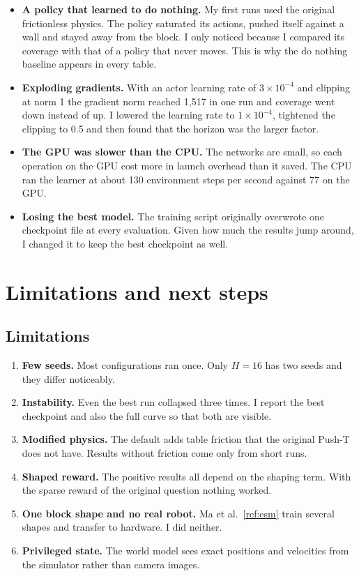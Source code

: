 \documentclass[11pt,a4paper]{article}
\renewcommand{\cite}[1]{\ref{ref:#1}}
\begin{document}
\begin{itemize}
  \item \textbf{A policy that learned to do nothing.} My first runs used the original frictionless
        physics. The policy saturated its actions, pushed itself against a wall and stayed away from
        the block. I only noticed because I compared its coverage with that of a policy that never
        moves. This is why the do nothing baseline appears in every table.
  \item \textbf{Exploding gradients.} With an actor learning rate of $3\times10^{-4}$ and
        clipping at norm 1 the gradient norm reached 1{,}517 in one run and coverage went down
        instead of up. I lowered the learning rate to $1\times10^{-4}$, tightened the clipping to 0.5
        and then found that the horizon was the larger factor.
  \item \textbf{The GPU was slower than the CPU.} The networks are small, so each operation on the
        GPU cost more in launch overhead than it saved. The CPU ran the learner at about 130
        environment steps per second against 77 on the GPU.
  \item \textbf{Losing the best model.} The training script originally overwrote one checkpoint file
        at every evaluation. Given how much the results jump around, I changed it to keep the best
        checkpoint as well.
\end{itemize}

\section{Limitations and next steps}
\label{sec:limits}

\subsection{Limitations}

\begin{enumerate}
  \item \textbf{Few seeds.} Most configurations ran once. Only $H=16$ has two seeds and they differ
        noticeably.
  \item \textbf{Instability.} Even the best run collapsed three times. I report the best checkpoint
        and also the full curve so that both are visible.
  \item \textbf{Modified physics.} The default adds table friction that the original Push-T does
        not have. Results without friction come only from short runs.
  \item \textbf{Shaped reward.} The positive results all depend on the shaping term. With the sparse
        reward of the original question nothing worked.
  \item \textbf{One block shape and no real robot.} Ma et al.~\cite{esm} train several shapes and
        transfer to hardware. I did neither.
  \item \textbf{Privileged state.} The world model sees exact positions and velocities from the
        simulator rather than camera images.
\end{enumerate}
\end{document}
